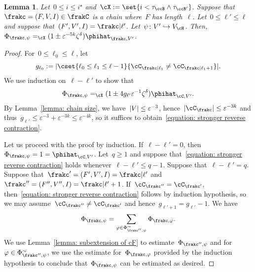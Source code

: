 \documentclass[11pt]{amsart}
\newcommand{\eps}{\varepsilon}
\DeclarePairedDelimiter{\abs}{\lvert}{\rvert}
\newcommand{\Xeq}{=_{\cX}}
\def\phi{\varphi}
\newcommand{\injection}{\hookrightarrow}
\newtheorem{lemma}[algocf]{Lemma}
\theoremstyle{definition}
\numberwithin{equation}{section}
\begin{document}
	\begin{lemma}\label{lemma: reverse contraction}
		Let~$0\leq i\leq i^\star$ and~$\cX:=\set{i<\tau_{\ccB}\wedge\tau_{\ccB'}}$.
		Suppose that~$\frakc=(F,V,I)\in\frakC$ is a chain where~$F$ has length~$\ell$.
		Let~$0\leq \ell'\leq\ell$ and suppose that~$(F',V',I)=\frakc|\ell'$.
		Let~$\psi\colon V'\injection V_\cH$.
		Then,~$\Phi_{\frakc,\psi}\Xeq(1\pm \eps^{-5k}\zeta^\delta)\phihat_{\frakc,V'}$.
	\end{lemma}
	
	\begin{proof}
		For~$0\leq\ell_0\leq\ell$, let
		\begin{equation*}
			g_{\ell_0}:=\abs{\cset{ \ell_0\leq\ell_1\leq\ell-1 }{ \cC_{\frakc|\ell_1}\neq\cC_{\frakc|\ell_1+1} }}.
		\end{equation*}
		We use induction on~$\ell-\ell'$ to show that
		\begin{equation}\label{equation: stronger reverse contraction}
			\Phi_{\frakc,\psi}\Xeq (1\pm 4g_{\ell'}\eps^{-1}\zeta^\delta)\phihat_{\cC,V'}.
		\end{equation}
		By Lemma~\ref{lemma: chain size}, we have~$\abs{V}\leq \eps^{-3}$, hence~$\abs{\cC_\frakc}\leq \eps^{-3k}$ and thus~$g_{\ell'}\leq \eps^{-3}+\eps^{-3k}\leq\eps^{-4k}$, so it suffices to obtain~\eqref{equation: stronger reverse contraction}.
		
		Let us proceed with the proof by induction.
		If~$\ell-\ell'=0$, then~$\Phi_{\frakc,\psi}=1=\phihat_{\cC,V'}$.
		Let~$q\geq 1$ and suppose that~\eqref{equation: stronger reverse contraction} holds whenever~$\ell-\ell'\leq q-1$.
		Suppose that~$\ell-\ell'=q$.
		Suppose that~$\frakc'=(F',V',I)=\frakc|\ell'$ and~$\frakc''=(F'',V'',I)=\frakc|\ell'+1$.
		If~$\cC_{\frakc''}=\cC_{\frakc'}$, then~\eqref{equation: stronger reverse contraction} follows by induction hypothesis, so we may assume~$\cC_{\frakc''}\neq\cC_{\frakc'}$ and hence~$g_{\ell'+1}=g_{\ell'}-1$.
		We have
		\begin{equation}\label{equation: reverse contraction split}
			\Phi_{\frakc,\psi}=\sum_{\phi\in\Phi_{\frakc'',\psi}^\sim}\Phi_{\frakc,\phi}.
		\end{equation}
		We use Lemma~\ref{lemma: subextension of cF} to estimate~$\Phi_{\frakc'',\psi}$ and for~$\phi\in\Phi_{\frakc'',\psi}^\sim$, we use the estimate for~$\Phi_{\frakc,\phi}$ provided by the induction hypothesis to conclude that~$\Phi_{\frakc,\psi}$ can be estimated as desired.
		

\end{proof}
\end{document}
